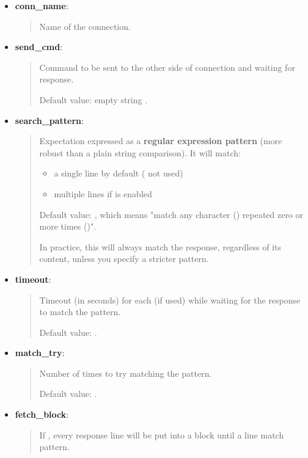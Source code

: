 \begin{itemize}
\item \textbf{conn\_name}:
  \begin{quote}
    Name of the connection.
  \end{quote}

  \item \textbf{send\_cmd}:
  \begin{quote}
    Command to be sent to the other side of connection and waiting for response.

    Default value: empty string .
  \end{quote}

\item \textbf{search\_pattern}:
  \begin{quote}
    Expectation expressed as a \textbf{regular expression pattern} (more robust than a plain string comparison).
    It will match:
    \begin{itemize}
      \item a single line by default ( not used)
      \item multiple lines if  is enabled
    \end{itemize}

    Default value: , which means "match any character () repeated zero or more times (\rcode{*})".

    In practice, this will always match the response, regardless of its content, unless you specify a stricter pattern.
  \end{quote}

\item \textbf{timeout}:
  \begin{quote}
    Timeout (in seconds) for each  (if used) while waiting for the response to match the pattern.

    Default value: .
  \end{quote}

\item \textbf{match\_try}:
  \begin{quote}
    Number of times to try matching the pattern.

    Default value: .
  \end{quote}

\item \textbf{fetch\_block}:
  \begin{quote}
    If , every response line will be put into a block until a line match  pattern.


\end{quote}
\end{itemize}
